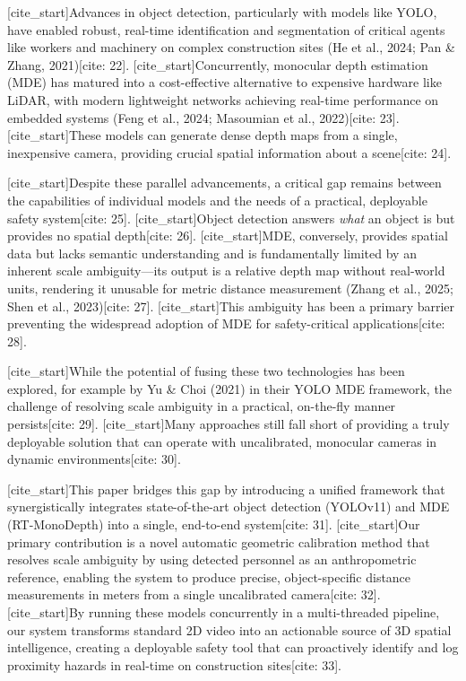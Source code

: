 [cite_start]Advances in object detection, particularly with models like YOLO, have enabled robust, real-time identification and segmentation of critical agents like workers and machinery on complex construction sites (He et al., 2024; Pan \& Zhang, 2021)[cite: 22]. [cite_start]Concurrently, monocular depth estimation (MDE) has matured into a cost-effective alternative to expensive hardware like LiDAR, with modern lightweight networks achieving real-time performance on embedded systems (Feng et al., 2024; Masoumian et al., 2022)[cite: 23]. [cite_start]These models can generate dense depth maps from a single, inexpensive camera, providing crucial spatial information about a scene[cite: 24].

[cite_start]Despite these parallel advancements, a critical gap remains between the capabilities of individual models and the needs of a practical, deployable safety system[cite: 25]. [cite_start]Object detection answers \textit{what} an object is but provides no spatial depth[cite: 26]. [cite_start]MDE, conversely, provides spatial data but lacks semantic understanding and is fundamentally limited by an inherent scale ambiguity—its output is a relative depth map without real-world units, rendering it unusable for metric distance measurement (Zhang et al., 2025; Shen et al., 2023)[cite: 27]. [cite_start]This ambiguity has been a primary barrier preventing the widespread adoption of MDE for safety-critical applications[cite: 28].

[cite_start]While the potential of fusing these two technologies has been explored, for example by Yu \& Choi (2021) in their YOLO MDE framework, the challenge of resolving scale ambiguity in a practical, on-the-fly manner persists[cite: 29]. [cite_start]Many approaches still fall short of providing a truly deployable solution that can operate with uncalibrated, monocular cameras in dynamic environments[cite: 30].

[cite_start]This paper bridges this gap by introducing a unified framework that synergistically integrates state-of-the-art object detection (YOLOv11) and MDE (RT-MonoDepth) into a single, end-to-end system[cite: 31]. [cite_start]Our primary contribution is a novel automatic geometric calibration method that resolves scale ambiguity by using detected personnel as an anthropometric reference, enabling the system to produce precise, object-specific distance measurements in meters from a single uncalibrated camera[cite: 32]. [cite_start]By running these models concurrently in a multi-threaded pipeline, our system transforms standard 2D video into an actionable source of 3D spatial intelligence, creating a deployable safety tool that can proactively identify and log proximity hazards in real-time on construction sites[cite: 33].

